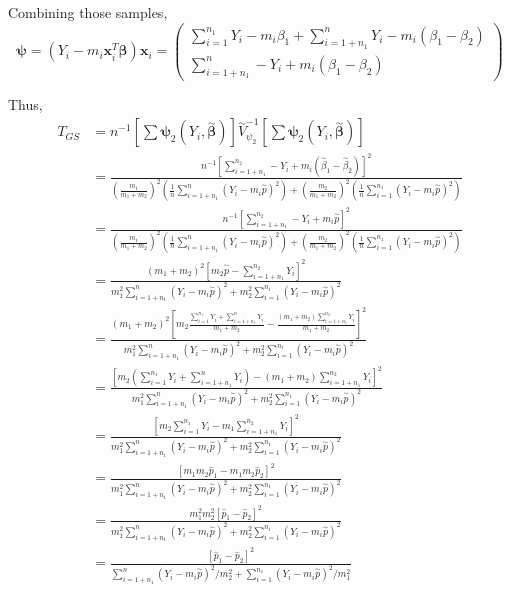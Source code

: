 \documentclass[
  letterpaper,
  DIV=11,
  numbers=noendperiod]{scrreprt}
\begin{document}
Combining those samples,
\[\boldsymbol \psi =(Y_i - m_i \mathbf x_i^T \boldsymbol \beta) \mathbf x_i =
\begin{pmatrix} \sum_{i=1}^{n_1} Y_i -m_i \beta_1 + \sum_{i=1+ n_1}^{n} Y_i -m_i (\beta_1- \beta_2) \\ \sum_{i=1+ n_1}^{n} -Y_i +m_i (\beta_1- \beta_2)\end{pmatrix}\]

Thus, \[\begin{aligned}
T_{GS} &= n^{-1} \left[\sum \boldsymbol \psi_2(Y_i, \overset \sim {\boldsymbol \beta}) \right] \overset \sim V_{\psi_2}^{-1} \left[\sum \boldsymbol \psi_2(Y_i, \overset \sim {\boldsymbol \beta}) \right] \\
&=  \frac{n^{-1}\left[\sum_{i= 1+n_1}^{n_2}-Y_i +m_i (\overset \sim \beta_1- \overset \sim \beta_2) \right]^2}{\left( \frac {m_1}{m_1+m_2}\right)^2\left( \frac 1 n \sum_{i=1+n_1}^{n} (Y_i - m_i \overset \sim p )^2\right)+ \left( \frac {m_2}{m_1+m_2}\right)^2\left( \frac 1 n \sum_{i=1}^{n_1} (Y_i - m_i \overset \sim p )^2\right)} \\
&=  \frac{n^{-1}\left[\sum_{i= 1+n_1}^{n_2}-Y_i +m_i \overset \sim p \right]^2}{\left( \frac {m_1}{m_1+m_2}\right)^2\left( \frac 1 n \sum_{i=1+n_1}^{n} (Y_i - m_i \overset \sim p )^2\right)+ \left( \frac {m_2}{m_1+m_2}\right)^2\left( \frac 1 n \sum_{i=1}^{n_1} (Y_i - m_i \overset \sim p )^2\right)} \\
&=  \frac{(m_1+ m_2)^2\left[m_2 \overset \sim p -\sum_{i= 1+n_1}^{n_2}Y_i \right]^2}{m_1^2 \sum_{i=1+n_1}^{n} (Y_i - m_i \overset \sim p )^2+ m_2^2  \sum_{i=1}^{n_1} (Y_i - m_i \overset \sim p )^2} \\
&=  \frac{(m_1+ m_2)^2\left[m_2 \frac{\sum_{i=1}^{n_1} Y_i+\sum_{i=1+n_1}^{n} Y_i}{m_1 + m_2} -\frac{(m_1+m_2)\sum_{i= 1+n_1}^{n_2}Y_i}{m_1+m_2} \right]^2}{m_1^2 \sum_{i=1+n_1}^{n} (Y_i - m_i \overset \sim p )^2+ m_2^2  \sum_{i=1}^{n_1} (Y_i - m_i \overset \sim p )^2} \\
&=  \frac{\left[m_2 (\sum_{i=1}^{n_1} Y_i+\sum_{i=1+n_1}^{n} Y_i) -(m_1+m_2)\sum_{i= 1+n_1}^{n_2}Y_i \right]^2}{m_1^2 \sum_{i=1+n_1}^{n} (Y_i - m_i \overset \sim p )^2+ m_2^2  \sum_{i=1}^{n_1} (Y_i - m_i \overset \sim p )^2} \\
&=  \frac{\left[m_2 \sum_{i=1}^{n_1} Y_i -m_1\sum_{i= 1+n_1}^{n_2}Y_i \right]^2}{m_1^2 \sum_{i=1+n_1}^{n} (Y_i - m_i \overset \sim p )^2+ m_2^2  \sum_{i=1}^{n_1} (Y_i - m_i \overset \sim p )^2} \\
&=  \frac{\left[m_1m_2 \hat p_1 -m_1 m_2 \hat p_2 \right]^2}{m_1^2 \sum_{i=1+n_1}^{n} (Y_i - m_i \overset \sim p )^2+ m_2^2  \sum_{i=1}^{n_1} (Y_i - m_i \overset \sim p )^2} \\
&=  \frac{m_1^2m_2^2\left[\hat p_1 -\hat p_2 \right]^2}{m_1^2 \sum_{i=1+n_1}^{n} (Y_i - m_i \overset \sim p )^2+ m_2^2  \sum_{i=1}^{n_1} (Y_i - m_i \overset \sim p )^2} \\
&=  \frac{\left[\hat p_1 -\hat p_2 \right]^2}{\sum_{i=1+n_1}^{n} (Y_i - m_i \overset \sim p )^2/m_2^2+  \sum_{i=1}^{n_1} (Y_i - m_i \overset \sim p )^2/m_1^2} \\
\end{aligned}\]
\end{document}

